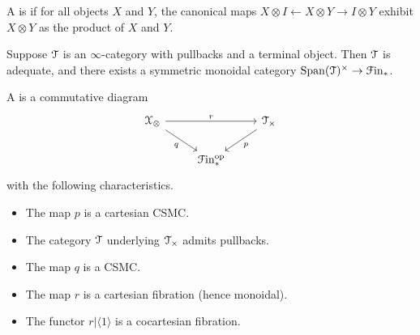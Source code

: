 \documentclass[main.tex]{subfiles}
\begin{document}
\begin{definition}
  A  is  if for all objects $X$ and $Y$, the canonical maps $X \otimes I \leftarrow X \otimes Y \to I \otimes Y$ exhibit $X \otimes Y$ as the product of $X$ and $Y$.
\end{definition}

\begin{proposition}
  Suppose $\mathcal{T}$ is an $\infty$-category with pullbacks and a terminal object. Then $\mathcal{T}$ is adequate, and there exists a symmetric monoidal category $\mathrm{Span}(\mathcal{T})^{\times} \to \mathcal{F}\mathrm{in}_{*}$.
\end{proposition}

\begin{definition}
  A  is a commutative diagram
  \begin{equation*}
    \begin{tikzcd}
      \category{X}_{\otimes}
      \arrow[rr, "r"]
      \arrow[dr, swap, "q"]
      && \category{T}_{\times}
      \arrow[dl, "p"]
      \\
      & \Finp\op
    \end{tikzcd}
  \end{equation*}
  with the following characteristics.
  \begin{itemize}
    \item The map $p$ is a cartesian CSMC.

    \item The category $\mathcal{T}$ underlying $\mathcal{T}_{\times}$ admits pullbacks.

    \item The map $q$ is a CSMC.

    \item The map $r$ is a cartesian fibration (hence monoidal).

    \item The functor $r|\langle 1 \rangle$ is a cocartesian fibration.


\end{itemize}
\end{definition}
\end{document}
